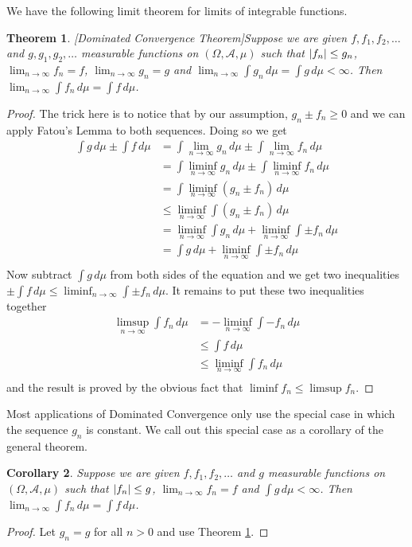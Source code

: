 \documentclass{amsart}
\newtheorem{thm}{Theorem}[section]
\newtheorem{cor}[thm]{Corollary}
\theoremstyle{remark}
\theoremstyle{definition}
\begin{document}
We have the following limit theorem for limits of integrable
functions.
\begin{thm}\label{DCT}[Dominated Convergence Theorem]Suppose we are given $f, f_1, f_2, \dots$ and $g,g_1,g_2,
  \dots$ measurable functions on $(\Omega,
  \mathcal{A}, \mu)$ such that $\left \vert f_n \right \vert \leq g_n$, $\lim_{n \to
    \infty} f_n = f$, $\lim_{n \to
    \infty} g_n = g$ and $\lim_{n \to \infty} \int g_n \, d \mu  =
  \int g \, d \mu < \infty$.  Then $\lim_{n \to \infty} \int f_n \,
  d\mu = \int f \, d\mu$.
\end{thm}
\begin{proof}The trick here is to notice that by our assumption, $g_n
  \pm f_n \geq 0$ and we can apply Fatou's Lemma to both sequences.
  Doing so we get
\begin{align*}
\int g \, d\mu \pm \int f \, d\mu &= \int \lim_{n \to \infty} g_n \,
d\mu \pm \int \lim_{n \to \infty}  f_n \, d\mu \\
&=\int \liminf_{n \to \infty} g_n \,
d\mu \pm \int \liminf_{n \to \infty}  f_n \, d\mu \\
&=\int \liminf_{n \to \infty} \left (g_n  \pm  f_n \right ) \, d\mu \\
&\leq \liminf_{n \to \infty} \int \left (g_n  \pm  f_n \right ) \, d\mu \\
&= \liminf_{n \to \infty} \int g_n \, d\mu + \liminf_{n \to \infty} \int \pm  f_n  \, d\mu \\
&= \int g \, d\mu + \liminf_{n \to \infty} \int \pm  f_n  \, d\mu \\
\end{align*}
Now subtract $\int g \, d\mu$ from both sides of the equation and we
get two inequalities $\pm \int f \, d\mu \leq \liminf_{n \to \infty}
\int \pm  f_n  \, d\mu $.  It remains to put these two inequalities
together 
\begin{align*}
\limsup_{n \to \infty} \int f_n \, d\mu &= -\liminf_{n \to \infty}
\int -f_n \, d\mu \\
&\leq \int f \, d\mu \\
&\leq \liminf_{n \to \infty} \int f_n \, d\mu \\
\end{align*}
and the result is proved by the
obvious fact that $\liminf f_n \leq \limsup f_n$.
\end{proof}
Most applications of Dominated Convergence only use the special case in
which the sequence $g_n$ is constant.  We call out this special case
as a corollary of the general theorem.
\begin{cor}Suppose we are given $f, f_1, f_2, \dots$ and $g$ measurable functions on $(\Omega,
  \mathcal{A}, \mu)$ such that $\left \vert f_n \right \vert \leq g$, $\lim_{n \to
    \infty} f_n = f$ and $\int g \, d \mu < \infty$.  Then $\lim_{n \to \infty} \int f_n \,
  d\mu = \int f \, d\mu$.
\end{cor}
\begin{proof}Let $g_n = g$ for all $n>0$ and use Theorem \ref{DCT}.
\end{proof}
\end{document}
